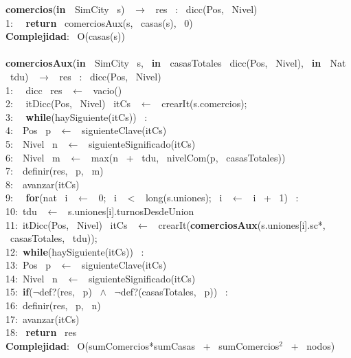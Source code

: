 \begin{Algoritmos}
\textbf{comercios}(\textbf{in \ }SimCity \ s) \ $\rightarrow $ \ res \ : \ dicc(Pos, \ Nivel)\\
1: \  \ \textbf{return} \ comerciosAux(s, \ casas(s), \ 0)\\
\textbf{Complejidad}: \ O(casas(s))\\
\\
\textbf{comerciosAux}(\textbf{in \ }SimCity \ s, \ \textbf{in \ }casasTotales \ dicc(Pos, \ Nivel), \ \textbf{in \ }Nat \ tdu) \ $\rightarrow $ \ res \ : \ dicc(Pos, \ Nivel)\\
1: \  \ dicc \ res \ $\leftarrow$ \ vacio()\\
2: \  \ itDicc(Pos, \ Nivel) \ itCs \ $\leftarrow$ \ crearIt(s.comercios);\\
3: \  \ \textbf{while}(haySiguiente(itCs)) \ :\\
4:\indent  \  \ Pos \ p \ $\leftarrow$ \ siguienteClave(itCs)\\
5:\indent  \  \ Nivel \ n \ $\leftarrow$ \ siguienteSignificado(itCs)\\
6:\indent  \  \ Nivel \ m \ $\leftarrow$ \ max(n \ + \ tdu, \ nivelCom(p, \ casasTotales))\\
7:\indent  \  \ definir(res, \ p, \ m)\\
8:\indent  \  \ avanzar(itCs)\\
9: \  \ \textbf{for}(nat \ i \ $\leftarrow$ \ 0; \ i \ $<$ \ long(s.uniones); \ i \ $\leftarrow$ \ i \ + \ 1) \ : \ \\
10:\indent  \ tdu \ $\leftarrow$ \ s.uniones[i].turnosDesdeUnion\\
11:\indent  \ itDicc(Pos, \ Nivel) \ itCs \ $\leftarrow$ \ crearIt(\textbf{comerciosAux}(s.uniones[i].sc*, \ casasTotales, \ tdu));\\
12:\indent  \ \textbf{while}(haySiguiente(itCs)) \ :\\
13:\indent \indent  \ Pos \ p \ $\leftarrow$ \ siguienteClave(itCs)\\
14:\indent \indent  \ Nivel \ n \ $\leftarrow$ \ siguienteSignificado(itCs)\\
15:\indent \indent  \ \textbf{if}($\neg$def?(res, \ p) \ $\wedge$ \ $\neg$def?(casasTotales, \ p)) \ :\\
16:\indent \indent \indent  \ definir(res, \ p, \ n)\\
17:\indent \indent  \ avanzar(itCs)\\
18: \ \textbf{return} \ res\\
\textbf{Complejidad}: \ O(sumComercios*sumCasas \ + \ sumComercios$^2$ \ + \ nodos)\\

\end{Algoritmos}
